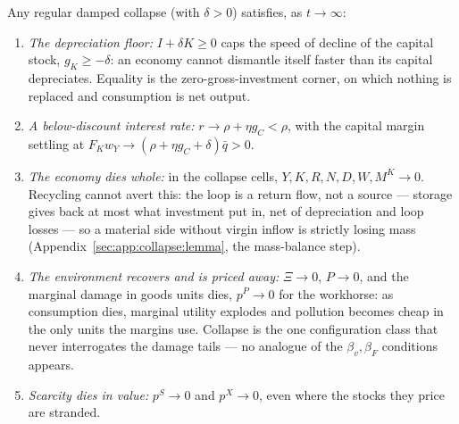 \begin{lemma}\label{lem:sp:lr:collapse}
Any regular damped collapse (with $\delta>0$) satisfies, as $t\to\infty$:
\begin{enumerate}
    \item \emph{The depreciation floor:} $I+\delta K\ge0$ caps the speed of decline of the
    capital stock, $g_K\ge-\delta$: an economy cannot dismantle itself faster than its
    capital depreciates. Equality is the zero-gross-investment corner, on which nothing is
    replaced and consumption is net output.
    \item \emph{A below-discount interest rate:} $r\to\rho+\eta g_C<\rho$, with the capital
    margin settling at $F_Kw_Y\to\left(\rho+\eta g_C+\delta\right)\bar q>0$.
    \item \emph{The economy dies whole:} in the collapse cells, $Y,K,R,N,D,W,M^K\to0$.
    Recycling cannot avert this: the loop is a return flow, not a source --- storage gives
    back at most what investment put in, net of depreciation and loop losses --- so a
    material side without virgin inflow is strictly losing mass
    (Appendix~\ref{sec:app:collapse:lemma}, the mass-balance step).
    \item \emph{The environment recovers and is priced away:} $\Xi\to0$, $P\to0$, and the
    marginal damage in goods units dies, $p^P\to0$ for the workhorse: as consumption dies,
    marginal utility explodes and pollution becomes cheap in the only units the margins use.
    Collapse is the one configuration class that never interrogates the damage tails ---
    no analogue of the $\beta_v,\beta_F$ conditions appears.
    \item \emph{Scarcity dies in value:} $p^S\to0$ and $p^X\to0$, even where the stocks they
    price are stranded.
\end{enumerate}
\end{lemma}

